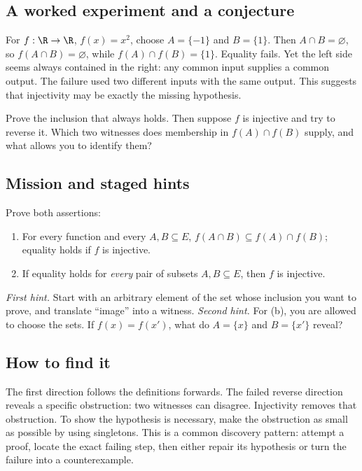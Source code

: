 \subsection*{A worked experiment and a conjecture}

For $f:\R\to\R$, $f(x)=x^2$, choose $A=\{-1\}$ and $B=\{1\}$.
Then $A\cap B=\varnothing$, so $f(A\cap B)=\varnothing$, while
$f(A)\cap f(B)=\{1\}$. Equality fails. Yet the left side seems always
contained in the right: any common input supplies a common output.
The failure used two different inputs with the same output. This suggests that
injectivity may be exactly the missing hypothesis.

\begin{think}
Prove the inclusion that always holds. Then suppose $f$ is injective and
try to reverse it. Which two witnesses does membership in $f(A)\cap f(B)$ supply,
and what allows you to identify them?
\end{think}

\subsection*{Mission and staged hints}

Prove both assertions:
\begin{enumerate}[label=(\alph*)]
\item For every function and every $A,B\subseteq E$,
$f(A\cap B)\subseteq f(A)\cap f(B)$; equality holds if $f$ is injective.
\item If equality holds for \emph{every} pair of subsets $A,B\subseteq E$,
then $f$ is injective.
\end{enumerate}
\emph{First hint.} Start with an arbitrary element of the set whose inclusion
you want to prove, and translate ``image'' into a witness.
\emph{Second hint.} For (b), you are allowed to choose the sets. If $f(x)=f(x')$,
what do $A=\{x\}$ and $B=\{x'\}$ reveal?

\subsection*{How to find it}

The first direction follows the definitions forwards. The failed reverse direction
reveals a specific obstruction: two witnesses can disagree. Injectivity removes
that obstruction. To show the hypothesis is necessary, make the obstruction as
small as possible by using singletons. This is a common discovery pattern:
attempt a proof, locate the exact failing step, then either repair its hypothesis
or turn the failure into a counterexample.

